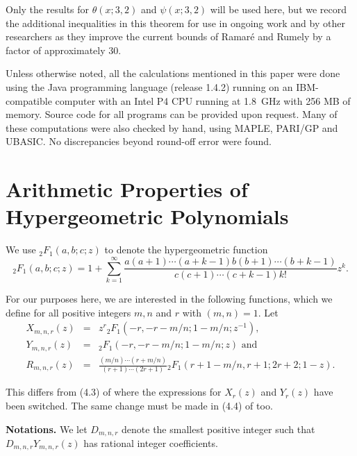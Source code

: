\documentclass{jT}
\theoremstyle{definition}
\begin{document}
Only the results for $\theta(x; 3,2)$ and $\psi(x; 3,2)$ will be used here, but we record the additional
inequalities in this theorem for use in ongoing work and by other researchers as they improve the
current bounds of Ramar\'{e} and Rumely \cite{RR} by a factor of approximately 30.

Unless otherwise noted, all the calculations mentioned in this paper were done using the
Java programming language (release 1.4.2) running on an IBM-compatible computer with
an Intel P4 CPU running at 1.8~GHz with 256 MB of memory. Source code for all programs
can be provided upon request. Many of these computations were also checked by hand,
using MAPLE, PARI/GP and UBASIC. No discrepancies beyond round-off error were found.

\section{Arithmetic Properties of Hypergeometric Polynomials}

We use ${} _{2}F_{1}(a,b;c;z)$ to denote the hypergeometric 
function
\begin{displaymath}
{} _{2}F_{1}(a,b;c;z) 
= 1 + \sum_{k=1}^{\infty} \frac{a(a+1) \cdots (a+k-1)b(b+1) \cdots (b+k-1)} 
			       {c(c+1) \cdots (c+k-1) k!} z^{k}. 
\end{displaymath}

For our purposes here, we are interested in the following functions,
which we define for all positive integers $m,n$ and $r$ with $(m,n)=1$.
Let 
\begin{eqnarray*}
X_{m,n,r}(z) & = & z^{r} {} _{2}F_{1} \left( -r, -r-m/n; 1-m/n; z^{-1} \right), \\ 
Y_{m,n,r}(z) & = & {} _{2}F_{1} \left( -r, -r-m/n; 1-m/n; z \right) \mbox{ and } \\
R_{m,n,r}(z) & = & \frac{(m/n) \cdots (r+m/n)}{(r+1) \cdots (2r+1)} 
		   {} _{2}F_{1} \left( r+1-m/n, r+1; 2r+2; 1-z \right). 
\end{eqnarray*}               

This differs from (4.3) of \cite{Chud} where the expressions 
for $X_{r}(z)$ and $Y_{r}(z)$ have been switched. The same change 
must be made in (4.4) of \cite{Chud} too. 

\vspace{3.0mm}

\noindent
{\bf Notations.} We let $D_{m,n,r}$ denote the smallest positive 
integer such that $D_{m,n,r} Y_{m,n,r}(z)$ has rational 
integer coefficients.
\end{document}

